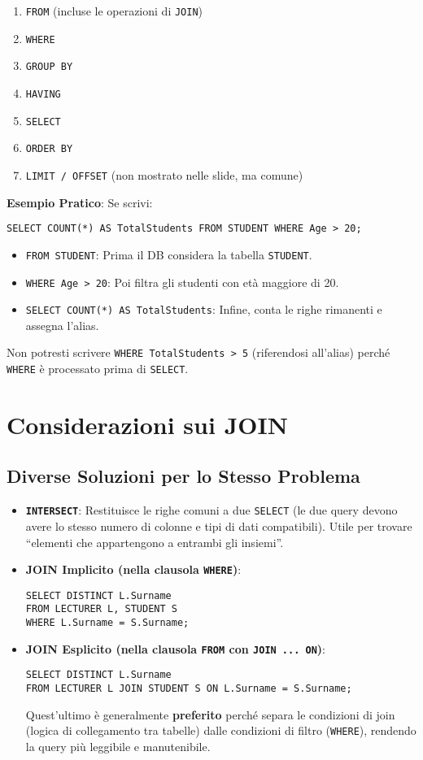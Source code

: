 \begin{enumerate}
    \item \texttt{FROM} (incluse le operazioni di \texttt{JOIN})
    \item \texttt{WHERE}
    \item \texttt{GROUP BY}
    \item \texttt{HAVING}
    \item \texttt{SELECT}
    \item \texttt{ORDER BY}
    \item \texttt{LIMIT / OFFSET} (non mostrato nelle slide, ma comune)
\end{enumerate}

\textbf{Esempio Pratico}:
Se scrivi:
\begin{verbatim}
SELECT COUNT(*) AS TotalStudents FROM STUDENT WHERE Age > 20;
\end{verbatim}
\begin{itemize}
    \item \texttt{FROM STUDENT}: Prima il DB considera la tabella \texttt{STUDENT}.
    \item \texttt{WHERE Age > 20}: Poi filtra gli studenti con età maggiore di 20.
    \item \texttt{SELECT COUNT(*) AS TotalStudents}: Infine, conta le righe rimanenti e assegna l'alias.
\end{itemize}
Non potresti scrivere \texttt{WHERE TotalStudents > 5} (riferendosi all'alias) perché \texttt{WHERE} è processato prima di \texttt{SELECT}.\section{Considerazioni sui JOIN}
\subsection{Diverse Soluzioni per lo Stesso Problema}
\begin{itemize}
    \item \textbf{\texttt{INTERSECT}}: Restituisce le righe comuni a due \texttt{SELECT} (le due query devono avere lo stesso numero di colonne e tipi di dati compatibili). Utile per trovare ``elementi che appartengono a entrambi gli insiemi''.
    \item \textbf{JOIN Implicito (nella clausola \texttt{WHERE})}:
    \begin{verbatim}
SELECT DISTINCT L.Surname
FROM LECTURER L, STUDENT S
WHERE L.Surname = S.Surname;
    \end{verbatim}
    \item \textbf{JOIN Esplicito (nella clausola \texttt{FROM} con \texttt{JOIN ... ON})}:
    \begin{verbatim}
SELECT DISTINCT L.Surname
FROM LECTURER L JOIN STUDENT S ON L.Surname = S.Surname;
    \end{verbatim}
    Quest'ultimo è generalmente \textbf{preferito} perché separa le condizioni di join (logica di collegamento tra tabelle) dalle condizioni di filtro (\texttt{WHERE}), rendendo la query più leggibile e manutenibile.
\end{itemize}

